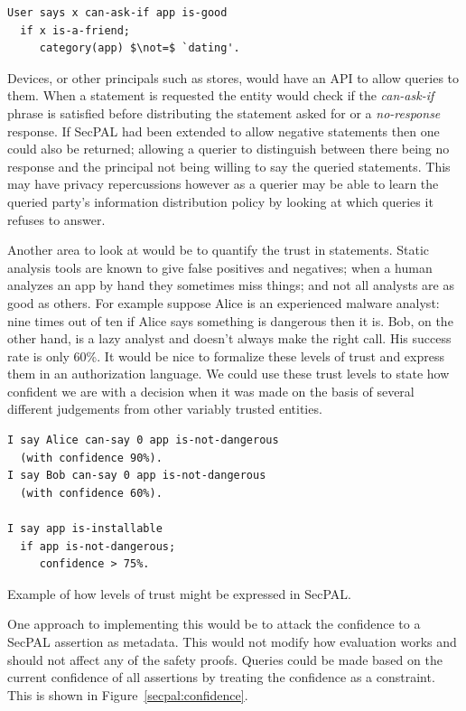 \documentclass[a4paper]{article}
\begin{document}
\begin{lstlisting}[language=SecPAL,mathescape=true]
User says x can-ask-if app is-good
  if x is-a-friend;
     category(app) $\not=$ `dating'.
\end{lstlisting}

Devices, or other principals such as stores, would have an API to allow queries
to them. When a statement is requested the entity would check if
the \emph{can-ask-if} phrase is satisfied before distributing the statement
asked for or a \emph{no-response} response.  If SecPAL had been extended
to allow negative statements then one could also be returned; allowing a querier
to distinguish between there being no response and the principal not being
willing to say the queried statements.  This may have privacy repercussions
however as a querier may be able to learn the queried party's information
distribution policy by looking at which queries it refuses to answer.  

Another area to look at would be to quantify the trust in statements. Static
analysis tools are known to give false positives and negatives; when a human
analyzes an app by hand they sometimes miss things; and not all analysts are as
good as others.  For example suppose Alice is an experienced malware analyst:
nine times out of ten if Alice says something is dangerous then it is.  Bob, on
the other hand, is a lazy analyst and doesn't always make the right call.  His
success rate is only 60\%.  It would be nice to formalize these levels of trust
and express them in an authorization language. We could use these trust levels
to state how confident we are with a decision when it was made on the basis of
several different judgements from other variably trusted entities.

\begin{marginfigure}
  \begin{lstlisting}[language=SecPAL]
I say Alice can-say 0 app is-not-dangerous 
  (with confidence 90%).
I say Bob can-say 0 app is-not-dangerous
  (with confidence 60%).

I say app is-installable 
  if app is-not-dangerous;
     confidence > 75%.
  \end{lstlisting}
  \caption{Example of how levels of trust might be expressed in SecPAL.}
  \label{secpal:confidence}
\end{marginfigure}

One approach to implementing this would be to attack the confidence to a SecPAL
assertion as metadata.  This would not modify how evaluation works
and should not affect any of the safety proofs.  Queries could be made based on
the current confidence of all assertions by treating the confidence as a
constraint.  This is shown in Figure~\ref{secpal:confidence}.
\end{document}
